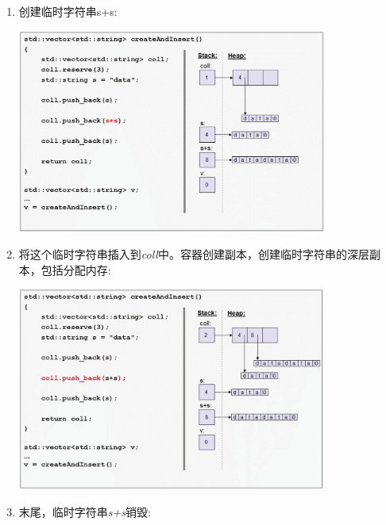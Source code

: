 \begin{itemize}
	\begin{enumerate}
		\item 创建临时字符串s+s:

		\begin{center}
			\includegraphics[width=0.8\textwidth]{part1/ch1/images/3}
		\end{center}
		\item 将这个临时字符串插入到\textit{coll}中。容器创建副本，创建临时字符串的深层副本，包括分配内存:

		\begin{center}
			\includegraphics[width=0.8\textwidth]{part1/ch1/images/4}
		\end{center}
		\item 末尾，临时字符串\textit{s+s}销毁:


\end{enumerate}
\end{itemize}
